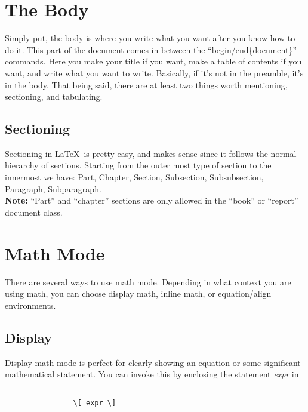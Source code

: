 \documentclass[11pt,letterpaper,twoside,titlepage]{article}
\newcommand{\latex}{\LaTeX \ }
\begin{document}
	\section{The Body}
	
		Simply put, the body is where you write what you want after you know how to do it.  This part of the document comes in between the ``begin/end\{document\}'' commands.  Here you make your title if you want, make a table of contents if you want, and write what you want to write.  Basically, if it's not in the preamble, it's in the body.  That being said, there are at least two things worth mentioning, sectioning, and tabulating.
		
		\subsection{Sectioning}
		
			Sectioning in \latex is pretty easy, and makes sense since it follows the normal hierarchy of sections.  Starting from the outer most type of section to the innermost we have: Part, Chapter, Section, Subsection, Subsubsection, Paragraph, Subparagraph. \\
			
			\textbf{Note:} ``Part'' and ``chapter'' sections are only allowed in the ``book'' or ``report'' document class.
			
\newpage
		
	\section{Math Mode}
	
		There are several ways to use math mode. Depending in what context you are using math, you can choose display math, inline math, or equation/align environments.
		
		\subsection{Display}
		
			Display math mode is perfect for clearly showing an equation or some significant mathematical statement.  You can invoke this by enclosing the statement \emph{expr} in 
			
			\begin{verbatim}
			
				\[ expr \]
			
			\end{verbatim}
			
\end{document}
